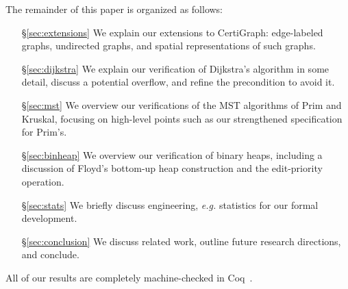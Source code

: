 The remainder of this paper is organized as follows:
\begin{itemize}
    \item[\S\ref{sec:extensions}] We explain our extensions to CertiGraph: edge-labeled graphs, undirected graphs, and spatial representations of such graphs.
    \item[\S\ref{sec:dijkstra}] We explain our verification of Dijkstra's algorithm in some detail, discuss a potential overflow, and refine the precondition to avoid it. %
    \item[\S\ref{sec:mst}] We overview our verifications of the MST algorithms of Prim and Kruskal, focusing on high-level points such as our strengthened specification for Prim's.
    \item[\S\ref{sec:binheap}] We overview our verification of binary heaps, including a discussion of Floyd's bottom-up heap construction and the edit-priority operation.
    \item[\S\ref{sec:stats}] We briefly discuss engineering, \emph{e.g.} statistics for our formal development.
    \item[\S\ref{sec:conclusion}] We discuss related work, outline future research directions, and conclude.
\end{itemize}

\noindent All of our results are completely machine-checked in Coq~\cite{CITE}.%
